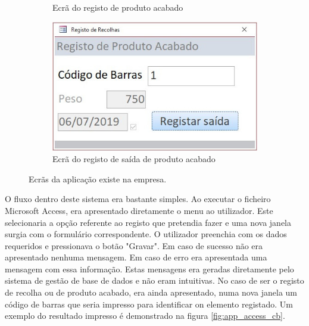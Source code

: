 \begin{figure}[h!]
\begin{subfigure}[c]{0.3\linewidth}
		\caption{Ecrã do registo de produto acabado}
	\end{subfigure}
	\begin{subfigure}[c]{0.3\linewidth}
		\includegraphics[width=\linewidth]{figuras/AppAccess/5-SaidaProdutoAcabado.jpg}
		\caption{Ecrã do registo de saída de produto acabado}
	\end{subfigure}
	
	\caption{Ecrãs da aplicação existe na empresa.}
	\label{fig:app_access}
\end{figure}

O fluxo dentro deste sistema era bastante simples. Ao executar o ficheiro Microsoft Access, era apresentado diretamente o menu ao utilizador. Este selecionaria a opção referente ao registo que pretendia fazer e uma nova janela surgia com o formulário correspondente. O utilizador preenchia com os dados requeridos e pressionava o botão "Gravar". Em caso de sucesso não era apresentado nenhuma mensagem. Em caso de erro era apresentada uma mensagem com essa informação. Estas mensagens era geradas diretamente pelo sistema de gestão de base de dados e não eram intuitivas. No caso de ser o registo de recolha ou de produto acabado, era ainda apresentado, numa nova janela um código de barras que seria impresso para identificar on elemento registado. Um exemplo do resultado impresso é demonstrado na figura \ref{fig:app_access_cb}.

